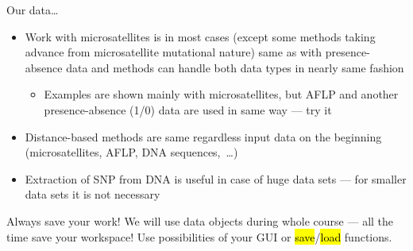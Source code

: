 \documentclass[compress, ucs, xelatex, 11pt, xcolor=svgnames,
  hyperref={
    bookmarks=true,
    unicode=true,
    colorlinks=true,
    pdftitle={Molecular data in R},
    plainpages=false,
    pdfauthor={Vojtech Zeisek},
    pdfsubject={Course about phylogeny and evolution in R},
    pdfcreator={XeLaTeX},
    pdfkeywords={R, evolution, phylogeny, molecular data},
    linkcolor=Tomato,
    anchorcolor=SaddleBrown,
    citecolor=Goldenrod,
    filecolor=DarkMagenta,
    menucolor=Sienna,
    urlcolor=DarkTurquoise,
    pdftex},
  url={hyphens, lowtilde} %
  ]{beamer}
\renewcommand{\texttt}[1]{\hl{\ttfamily #1}}
\begin{document}
\begin{frame}[allowframebreaks]{Our data\ldots}
\begin{itemize}
\begin{itemize}
    \end{itemize}
    \item Work with microsatellites is in most cases (except some methods taking advance from microsatellite mutational nature) same as with presence-absence data and methods can handle both data types in nearly same fashion
    \begin{itemize}
      \item Examples are shown mainly with microsatellites, but AFLP and another presence-absence (1/0) data are used in same way --- try it
    \end{itemize}
    \item Distance-based methods are same regardless input data on the beginning (microsatellites, AFLP, DNA sequences,~\ldots)
    \item Extraction of SNP from DNA is useful in case of huge data sets --- for smaller data sets it is not necessary
  \end{itemize}
  \begin{block}{Always save your work!}
    \alert{We will use data objects during whole course --- all the time save your workspace!} Use possibilities of your GUI or \texttt{save}/\texttt{load} functions.
  \end{block}
\end{frame}
\end{document}
